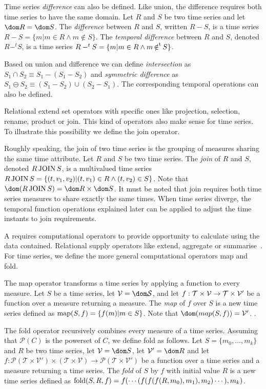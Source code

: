 Time series \emph{difference} can also be defined. Like union, the
difference requires both time series to have the same domain.
%
Let $R$ and $S$ be two time series and let $\dom R = \dom S$.
%
The \emph{difference} between $R$ and $S$, written $R-S$, is a time
series $R-S=\{m|m\in R\wedge m\notin S\}$.
%
The \emph{temporal difference} between $R$ and $S$, denoted $R-^t S$, 
is a time series $R-^tS=\{m|m\in R\wedge m \operatorname*{\notin^t} S\}$.


Based on union and difference we can define \emph{intersection} as
$S_1\cap S_2 \equiv S_1 - (S_1 - S_2)$ and \emph{symmetric difference}
as $S_1 \ominus S_2 \equiv (S_1 - S_2) \cup (S_2 - S_1)$. The
corresponding temporal operations can also be defined.


Relational  extend set operators with specific ones like
projection, selection, rename, product or join. This kind of operators
also make sense for time series. To illustrate this possibility we
define the join operator.

Roughly speaking, the join of two time series is the grouping of
measures sharing the same time attribute.  Let $R$ and $S$ be two time
series.  The \emph{join} of $R$ and $S$, denoted $R \operatorname*{JOIN} S$, is a
multivalued time series $R \operatorname*{JOIN} S = \{ (t,v_1,v_2) | (t,v_1) \in
R\wedge (t,v_2) \in S\}$. Note that $\dom(R\join
S)=\dom R\times\dom S$.
%
It must be noted that join requires both time series measures to share
exactly the same times. When time series diverge, the temporal
function operations explained later can be applied to adjust the time
instants to join requirements.


A  requires computational operators to provide opportunity
to calculate using the data contained. Relational  supply
operators like extend, aggregate or
summarise~\cite{date:introduction}. For time series, we define the more
general computational operators map and fold.

The map operator transforms a time series by applying a function to
every measure.  Let $S$ be a time series, let $\cal{V}=\dom S$, and
let $f:\cal{T}\times\cal{V}\rightarrow\cal{T}\times\cal{V'}$ be a
function over a measure returning a measure. The \emph{map} of $f$
over $S$ is a new time series defined as $\operatorname*{map}(S,f)=\{f(m)|m\in
S\}$. Note that $\dom(map(S,f))=\cal{V'}$.
%
.

The fold operator recursively combines every measure of a time
series. Assuming that $\mathcal{P}(C)$ is the powerset of $C$, we
define fold as follows.
%
Let $S=\{m_0,\dots, m_k\}$ and $R$ be two time series, let
$\mathcal{V}=\dom S$, let $\mathcal{V'}=\dom R$ and let 
%
$f:\mathcal{P}(\mathcal{T}\times\mathcal{V'}) \times (\mathcal{T}\times\mathcal{V}) \rightarrow \mathcal{P}(\mathcal{T}\times\mathcal{V'})$ 
%
be a function over a time series and a measure returning a time
series.
%
The \emph{fold} of $S$ by $f$ with initial value $R$ is a new time
series defined as $\operatorname*{fold}(S,R,f) = f(\cdots(f(f(f(R,m_0),\allowbreak
m_1),\allowbreak m_2)\cdots),\allowbreak m_k)$.
%


